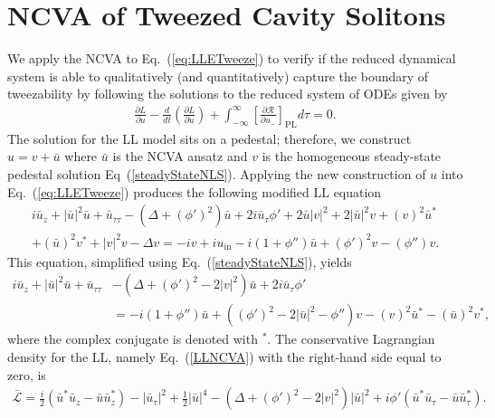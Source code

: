 \section[NCVA of Tweezed Cavity Solitons]{NCVA of Tweezed Cavity Solitons} \label{section:TweezeNCVA}
We apply the NCVA to Eq.~(\ref{eq:LLETweeze}) to verify if the reduced dynamical system is able to qualitatively (and quantitatively) capture the boundary of tweezability by following the solutions to the reduced system of ODEs given by 
\begin{align}
\frac{\partial L}{\partial u} - \frac{d}{dt} \left( \frac{\partial L }{\partial \dot{u}} \right) + \int_{-\infty}^{\infty} \left[ \frac{\partial \mathcal{R}}{\partial u_- } \right]_{\mathrm{PL}} d\tau = 0.
\label{tweezeEL}
\end{align}
The solution for the LL model sits on a pedestal; therefore, we construct $u = v + \bar{u}$ where $\bar{u}$ is the NCVA ansatz and $v$ is the homogeneous steady-state pedestal solution Eq~(\ref{steadyStateNLS}).  Applying the new construction of $u$ into Eq.~(\ref{eq:LLETweeze}) produces the following modified LL equation
\begin{align}
i \bar{u}_z + |\bar{u}|^2 \bar{u} + \bar{u}_{\tau\tau} - (\Delta + (\phi')^2) \bar{u} + 2i \bar{u}_{\tau} \phi' +  2\bar{u} |v|^2 + 2 |\bar{u}|^2 v + (v)^2 \bar{u}^* \nonumber \\
 + (\bar{u})^2 v^* + |v|^2 v - \Delta v =- i v + i u_{\mathrm{in}} - i (1+\phi'') \bar{u} + (\phi')^2 v - (\phi'')v.
\end{align}
This equation, simplified using Eq.~(\ref{steadyStateNLS}), yields
\begin{align}
i \bar{u}_z + |\bar{u}|^2 \bar{u} + \bar{u}_{\tau\tau} & - (\Delta + (\phi')^2 -2|v|^2) \bar{u} + 2i \bar{u}_{\tau} \phi'  \nonumber \\
 &= - i (1+\phi'') \bar{u} + \left((\phi')^2  - 2 |\bar{u}|^2- \phi''\right) v -  (v)^2 \bar{u}^* - (\bar{u})^2 v^*,
 \label{LLNCVA}
\end{align}
where the complex conjugate is denoted with $^*$.  The conservative Lagrangian density for the LL, namely Eq.~(\ref{LLNCVA}) with the right-hand side equal to zero, is
\begin{align}
\bar{\mathcal{L}} = \frac{i}{2} \left(\bar{u}^* \bar{u}_z - \bar{u}\bar{u}_z^* \right) - |\bar{u}_{\tau}|^2 + \frac{1}{2} |\bar{u}|^4 -\left( \Delta +  (\phi')^2 -2|v|^2 \right) |\bar{u}|^2 + i\phi' \left(\bar{u}^* \bar{u}_{\tau} - \bar{u}\bar{u}_{\tau}^*  \right).
\label{tweezeDensity} 
\end{align}
